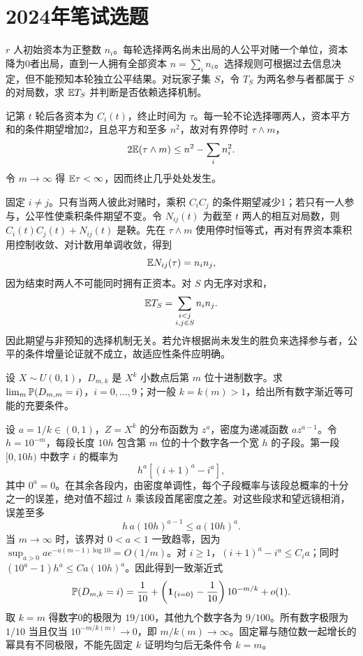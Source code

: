 \section{2024年笔试选题}
\begin{example}[原题1：公平多方博弈中内部对局数]\label{yau:2024-1}
$r$ 人初始资本为正整数 $n_i$。每轮选择两名尚未出局的人公平对赌一个单位，资本降为0者出局，直到一人拥有全部资本 $n=\sum_i n_i$。选择规则可根据过去信息决定，但不能预知本轮独立公平结果。对玩家子集 $S$，令 $T_S$ 为两名参与者都属于 $S$ 的对局数，求 $\mathbb E T_S$ 并判断是否依赖选择机制。
\end{example}
\begin{solve}
记第 $t$ 轮后各资本为 $C_i(t)$，终止时间为 $\tau$。每一轮不论选择哪两人，资本平方和的条件期望增加2，且总平方和至多 $n^2$，故对有界停时 $\tau\wedge m$，
\[
2\mathbb E(\tau\wedge m)\le n^2-\sum_i n_i^2.
\]
令 $m\to\infty$ 得 $\mathbb E\tau<\infty$，因而终止几乎处处发生。

固定 $i\ne j$。只有当两人彼此对赌时，乘积 $C_iC_j$ 的条件期望减少1；若只有一人参与，公平性使乘积条件期望不变。令 $N_{ij}(t)$ 为截至 $t$ 两人的相互对局数，则 $C_i(t)C_j(t)+N_{ij}(t)$ 是鞅。先在 $\tau\wedge m$ 使用停时恒等式，再对有界资本乘积用控制收敛、对计数用单调收敛，得到
\[
\mathbb E N_{ij}(\tau)=n_in_j,
\]
因为结束时两人不可能同时拥有正资本。对 $S$ 内无序对求和，
\[
\mathbb E T_S=\sum_{\substack{i<j\\i,j\in S}}n_in_j.
\]
因此期望与非预知的选择机制无关。若允许根据尚未发生的胜负来选择参与者，公平的条件增量论证就不成立，故适应性条件应明确。
\end{solve}

\begin{example}[原题3：随机幂的小数位极限]\label{yau:2024-3}
设 $X\sim U(0,1)$，$D_{m,k}$ 是 $X^k$ 小数点后第 $m$ 位十进制数字。求 $\lim_m\mathbb P(D_{m,m}=i)$，$i=0,\ldots,9$；对一般 $k=k(m)>1$，给出所有数字渐近等可能的充要条件。
\end{example}
\begin{solve}
设 $a=1/k\in(0,1)$，$Z=X^k$ 的分布函数为 $z^a$，密度为递减函数 $az^{a-1}$。令 $h=10^{-m}$，每段长度 $10h$ 包含第 $m$ 位的十个数字各一个宽 $h$ 的子段。第一段 $[0,10h)$ 中数字 $i$ 的概率为
\[
h^a[(i+1)^a-i^a],
\]
其中 $0^a=0$。在其余各段内，由密度单调性，每个子段概率与该段总概率的十分之一的误差，绝对值不超过 $h$ 乘该段首尾密度之差。对这些段求和望远镜相消，误差至多
\[
h\,a(10h)^{a-1}\le a(10h)^a.
\]
当 $m\to\infty$ 时，该界对 $0<a<1$ 一致趋零，因为 $\sup_{a>0}ae^{-a(m-1)\log10}=O(1/m)$。对 $i\ge1$，$(i+1)^a-i^a\le C_i a$；同时 $(10^a-1)h^a\le C a(10h)^a$。因此得到一致渐近式
\[
\mathbb P(D_{m,k}=i)=\frac1{10}+\left(\mathbf1_{\{i=0\}}-\frac1{10}\right)10^{-m/k}+o(1).
\]
取 $k=m$ 得数字0的极限为 $19/100$，其他九个数字各为 $9/100$。所有数字极限为 $1/10$ 当且仅当 $10^{-m/k(m)}\to0$，即 $m/k(m)\to\infty$。固定幂与随位数一起增长的幂具有不同极限，不能先固定 $k$ 证明均匀后无条件令 $k=m$。
\end{solve}

